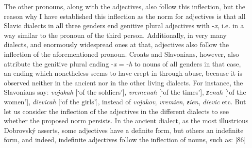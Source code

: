 The other pronouns, along with the adjectives, also follow this inflection, but the reason why I have established this inflection as the norm for adjectives is that all Slavic dialects in all three genders end genitive plural adjectives with -\textit{x},\linebreak{} i.e. in a way similar to the pronoun of the third person. Additionally, in very many dialects, and enormously widespread ones at that, adjectives also follow the inflection of the aforementioned pronoun. Croats and Slavonians, however, also attribute the genitive plural ending -\textit{x} = -\textit{h} to nouns of all genders in that case, an ending which nonetheless seems to have crept in through abuse, because it is observed neither in the ancient nor in the other living dialects. For instance, the Slavonians say: \textit{vojakah} [‘of the soldiers’], \textit{vremenah} [‘of the times’], \textit{ƶenah} [‘of the women’], \textit{dievicah} [‘of the girls’], instead of \textit{vojakov}, \textit{vremien}, \textit{ƶien}, \textit{dievic} etc. But let us consider the inflection of the adjectives in the different dialects to see whether the proposed norm persists. In the ancient dialect, as the most illustrious Dobrovský asserts, some adjectives have a definite form, but others an indefinite form, and indeed, indefinite adjectives follow the inflection of nouns, such as: [86]

\newpage

